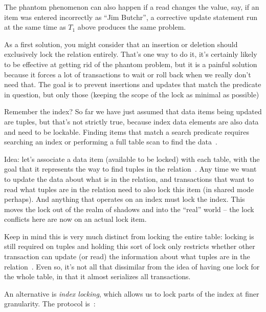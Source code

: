 The phantom phenomenon can also happen if a read changes the value, say, if an item was entered incorrectly as ``Jim Butchr'', a corrective update statement run at the same time as $T_{1}$ above produces the same problem.

As a first solution, you might consider that an insertion or deletion should exclusively lock the relation entirely. That's one way to do it, it's certainly likely to be effective at getting rid of the phantom problem, but it is a painful solution because it forces a lot of transactions to wait or roll back when we really don't need that. The goal is to prevent insertions and updates that match the predicate in question, but only those (keeping the scope of the lock as minimal as possible)

Remember the index? So far we have just assumed that data items being updated are tuples, but that's not strictly true, because index data elements are also data and need to be lockable. Finding items that match a search predicate requires searching an index or performing a full table scan to find the data~\cite{dsc}. 

Idea: let's associate a data item (available to be locked) with each table, with the goal that it represents the way to find tuples in the relation~\cite{dsc}. Any time we want to update the data about what is in the relation, and transactions that want to read what tuples are in the relation need to also lock this item (in shared mode perhaps). And anything that operates on an index must lock the index. This moves the lock out of the realm of shadows and into the ``real'' world -- the lock conflicts here are now on an actual lock item.

Keep in mind this is very much distinct from locking the entire table: locking is still required on tuples and holding this sort of lock only restricts whether other transaction can update (or read) the information about what tuples are in the relation~\cite{dsc}. Even so, it's not all that dissimilar from the idea of having one lock for the whole table, in that it almost serializes all transactions.

An alternative is \textit{index locking}, which allows us to lock parts of the index at finer granularity. The protocol is~\cite{dsc}:

